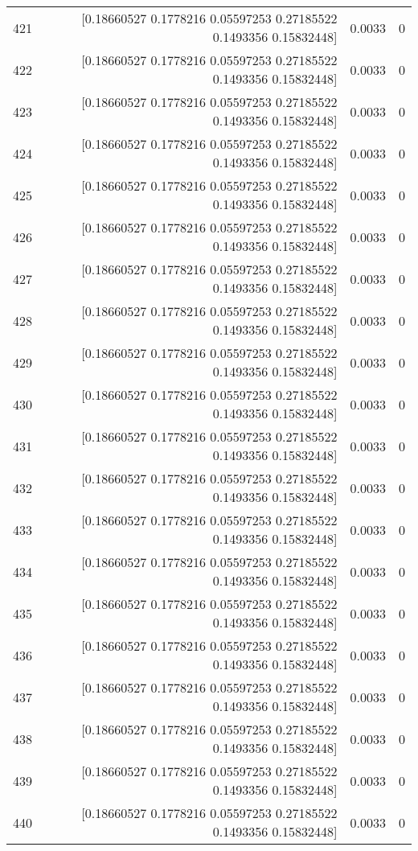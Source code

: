 \begin{longtable}{lrrr}
421 & [0.18660527 0.1778216  0.05597253 0.27185522 0.1493356  0.15832448] & 0.0033 & 0 \\
422 & [0.18660527 0.1778216  0.05597253 0.27185522 0.1493356  0.15832448] & 0.0033 & 0 \\
423 & [0.18660527 0.1778216  0.05597253 0.27185522 0.1493356  0.15832448] & 0.0033 & 0 \\
424 & [0.18660527 0.1778216  0.05597253 0.27185522 0.1493356  0.15832448] & 0.0033 & 0 \\
425 & [0.18660527 0.1778216  0.05597253 0.27185522 0.1493356  0.15832448] & 0.0033 & 0 \\
426 & [0.18660527 0.1778216  0.05597253 0.27185522 0.1493356  0.15832448] & 0.0033 & 0 \\
427 & [0.18660527 0.1778216  0.05597253 0.27185522 0.1493356  0.15832448] & 0.0033 & 0 \\
428 & [0.18660527 0.1778216  0.05597253 0.27185522 0.1493356  0.15832448] & 0.0033 & 0 \\
429 & [0.18660527 0.1778216  0.05597253 0.27185522 0.1493356  0.15832448] & 0.0033 & 0 \\
430 & [0.18660527 0.1778216  0.05597253 0.27185522 0.1493356  0.15832448] & 0.0033 & 0 \\
431 & [0.18660527 0.1778216  0.05597253 0.27185522 0.1493356  0.15832448] & 0.0033 & 0 \\
432 & [0.18660527 0.1778216  0.05597253 0.27185522 0.1493356  0.15832448] & 0.0033 & 0 \\
433 & [0.18660527 0.1778216  0.05597253 0.27185522 0.1493356  0.15832448] & 0.0033 & 0 \\
434 & [0.18660527 0.1778216  0.05597253 0.27185522 0.1493356  0.15832448] & 0.0033 & 0 \\
435 & [0.18660527 0.1778216  0.05597253 0.27185522 0.1493356  0.15832448] & 0.0033 & 0 \\
436 & [0.18660527 0.1778216  0.05597253 0.27185522 0.1493356  0.15832448] & 0.0033 & 0 \\
437 & [0.18660527 0.1778216  0.05597253 0.27185522 0.1493356  0.15832448] & 0.0033 & 0 \\
438 & [0.18660527 0.1778216  0.05597253 0.27185522 0.1493356  0.15832448] & 0.0033 & 0 \\
439 & [0.18660527 0.1778216  0.05597253 0.27185522 0.1493356  0.15832448] & 0.0033 & 0 \\
440 & [0.18660527 0.1778216  0.05597253 0.27185522 0.1493356  0.15832448] & 0.0033 & 0 \\

\end{longtable}
